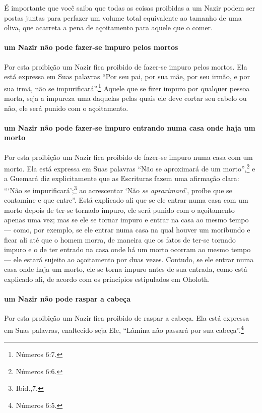 É importante que você saiba que todas as coisas proibidas a um Nazir
podem ser postas juntas para perfazer um volume total equivalente ao
tamanho de uma oliva, que acarreta a pena de açoitamento para aquele
que o comer.

\paragraph{um Nazir não pode fazer-se impuro pelos mortos}

Por esta proibição um Nazir fica proibido de fazer-se impuro pelos
mortos. Ela está expressa em Suas palavras ``Por seu pai, por sua mãe,
por seu irmão, e por sua irmã, não se impurificará''.\footnote{Números 6:7.}
Aquele que se fizer impuro por qualquer pessoa morta, seja a impureza
uma daquelas pelas quais ele deve cortar seu cabelo ou não, ele será
punido com o açoitamento.

\paragraph{um Nazir não pode fazer-se impuro entrando numa casa onde haja um morto}

Por esta proibição um Nazir fica proibido de fazer-se impuro numa casa
com um morto. Ela está expressa em Suas palavras ``Não se aproximará de
um morto'',\footnote{Números 6:6.} e a Guemará diz explicitamente que as
Escrituras fazem uma afirmação clara: ```Não se impurificará';\footnote{Ibid.,7.}
ao acrescentar `Não \emph{se aproximará}', proíbe que se
contamine e que entre''. Está explicado ali que se ele entrar numa casa
com um morto depois de ter-se tornado impuro, ele será punido com o
açoitamento apenas uma vez; mas se ele se tornar impuro e entrar na casa
ao mesmo tempo --- como, por exemplo, se ele entrar numa casa na qual
houver um moribundo e ficar ali até que o homem morra, de maneira que
os fatos de ter-se tornado impuro e o de ter entrado na casa onde há um
morto ocorram ao mesmo tempo --- ele estará sujeito ao açoitamento por
duas vezes. Contudo, se ele entrar numa casa onde haja um morto, ele se
torna impuro antes de sua entrada, como está explicado ali, de acordo
com os princípios estipulados em Oholoth.

\paragraph{um Nazir não pode raspar a cabeça}

Por esta proibição um Nazir fica proibido de raspar a cabeça. Ela está
expressa em Suas palavras, enaltecido seja Ele, ``Lâmina não passará por
sua cabeça''.\footnote{Números 6:5.}

